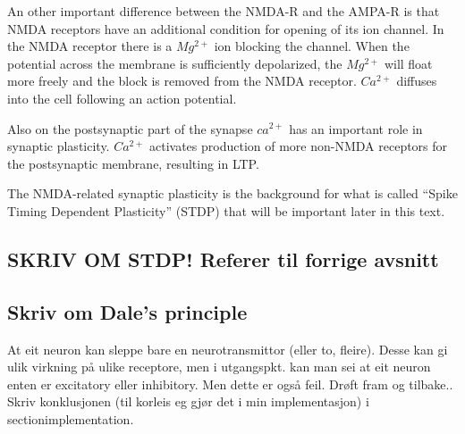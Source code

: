An other important difference between the NMDA-R and the AMPA-R is that NMDA receptors have an additional condition for opening of its ion channel. 
In the NMDA receptor there is a $Mg^{2+}$ ion blocking the channel. 
When the potential across the membrane is sufficiently depolarized, the $Mg^{2+}$ will float more freely and the block is removed from the NMDA receptor.
$Ca^{2+}$ diffuses into the cell following an action potential\cite{PrinciplesOfNeuralScience4edKAP12}.

Also on the postsynaptic part of the synapse $ca^{2+}$ has an important role in synaptic plasticity. 
$Ca^{2+}$ activates production of more non-NMDA receptors for the postsynaptic membrane, resulting in LTP\cite{AMPARtrafficingArtikkel}.%

The NMDA-related synaptic plasticity is the background for what is called ``Spike Timing Dependent Plasticity'' (STDP) that will be important later in this text.

\subsection{SKRIV OM STDP! Referer til forrige avsnitt}
\label{forklaringBakSTDP} %

\subsection{Skriv om Dale's  principle}
At eit neuron kan sleppe bare en neurotransmittor (eller to, fleire). Desse kan gi ulik virkning på ulike receptore, men i utgangspkt. kan man sei at eit neuron enten er excitatory eller inhibitory. 
Men dette er også feil. Drøft fram og tilbake.. Skriv konklusjonen (til korleis eg gjør det i min implementasjon) i section{implementation}.



